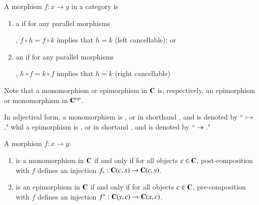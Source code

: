 \documentclass[12pt, a4paper, oneside, openright, titlepage]{book}
\begin{document}
\begin{defn}
    A morphism $f:x\rightarrow y$ in a category is \begin{enumerate}
        \item a  if for any parallel morphisms , $f\circ h = f\circ k$ implies that $h = k$ (left cancellable); or
        \item an  if for any parallel morphisms , $h\circ f = k\circ f$ implies that $h = k$ (right cancellable)
    \end{enumerate}
\end{defn}

\begin{rmk}
    Note that a monomorphism or epimorphism in $\normalfont\textbf{C}$ is, respectively, an epimorphism or monomorphism in $\normalfont\textbf{C}^{op}$.
\end{rmk}

\begin{nota}
    In adjectival form, a monomorphism is , or in shorthand , and is denoted by ``$\rightarrowtail$," whil a epimorphism is , or in shortand , and is denoted by ``$\twoheadrightarrow$."
\end{nota}

\begin{defn}
    A morphism $f:x\rightarrow y$:\begin{enumerate}
        \item is a monomorphism in $\normalfont\textbf{C}$ if and only if for all objects $c \in \normalfont\textbf{C}$, post-composition with $f$ defines an injection $f_*:\normalfont\textbf{C}(c,x)\rightarrow \normalfont\textbf{C}(c,y)$.
        \item is an epimorphism in $\normalfont\textbf{C}$ if and only if for all objects $c \in \normalfont\textbf{C}$, pre-composition with $f$ defines an injection $f^*:\normalfont\textbf{C}(y,c)\rightarrow \normalfont\textbf{C}(x,c)$.
    \end{enumerate}
\end{defn}
\end{document}
